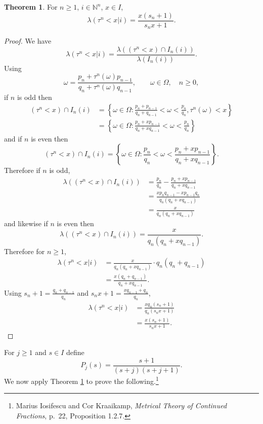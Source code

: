 \documentclass{article}
\theoremstyle{definition}
\newtheorem{theorem}{Theorem}
\theoremstyle{definition}
\begin{document}
\begin{theorem}
For $n \geq 1$, $i \in \mathbb{N}^n$, $x \in I$,
\[
\lambda(\tau^n<x| i) = \frac{x(s_n+1)}{s_nx+1}.
\]
\label{broden}
\end{theorem}
\begin{proof}
We have
\[
\lambda(\tau^n<x| i)=\frac{\lambda((\tau^n<x) \cap I_n(i))}{\lambda(I_n(i))}.
\]
Using
\[
\omega = \frac{p_n+\tau^n(\omega) p_{n-1}}{q_n+\tau^n(\omega) q_{n-1}},\qquad \omega \in \Omega,\quad n \geq 0,
\]
if $n$ is odd then
\begin{align*}
(\tau^n<x) \cap I_n(i) &= \left\{\omega \in \Omega: \frac{p_n+p_{n-1}}{q_n+q_{n-1}}<\omega<\frac{p_n}{q_n},
\tau^n(\omega)<x\right\}\\
&=\left\{ \omega \in \Omega: \frac{p_n+xp_{n-1}}{q_n+xq_{n-1}}<\omega<\frac{p_n}{q_n} \right\}
\end{align*}
and if $n$ is even then
\[
(\tau^n<x) \cap I_n(i) =\left\{ \omega \in \Omega: \frac{p_n}{q_n}<\omega< \frac{p_n+xp_{n-1}}{q_n+xq_{n-1}} \right\}.
\]
Therefore if $n$ is odd,
\begin{align*}
\lambda((\tau^n<x) \cap I_n(i) )&=\frac{p_n}{q_n}-\frac{p_n+xp_{n-1}}{q_n+xq_{n-1}}\\
&=\frac{xp_nq_{n-1}-xp_{n-1}q_n}{q_n(q_n+xq_{n-1})}\\
&=\frac{x}{q_n(q_n+xq_{n-1})}
\end{align*}
and likewise if $n$ is even then
\[
\lambda((\tau^n<x) \cap I_n(i) ) = \frac{x}{q_n(q_n+xq_{n-1})}.
\]
Therefore for $n \geq 1$,
\begin{align*}
\lambda(\tau^n<x| i)&=\frac{x}{q_n(q_n+xq_{n-1})} \cdot q_n(q_n+q_{n-1})\\
&=\frac{x(q_n+q_{n-1})}{q_n+xq_{n-1}}.
\end{align*}
Using $s_n+1 = \frac{q_n+q_{n-1}}{q_n}$ and $s_n x+1=
\frac{xq_{n-1}+q_n}{q_n}$,
\begin{align*}
\lambda(\tau^n<x| i)&=\frac{x q_n(s_n+1)}{q_n(s_nx+1)}\\
&=\frac{x(s_n+1)}{s_nx+1}.
\end{align*}
\end{proof}

For $j \geq 1$ and $s \in I$ define
\[
P_j(s)=\frac{s+1}{(s+j)(s+j+1)}.
\]
We now apply Theorem \ref{broden} to prove the following.\footnote{Marius Iosifescu and Cor Kraaikamp,
{\em Metrical Theory of Continued Fractions}, p.~22, Proposition 1.2.7.}
\end{document}
